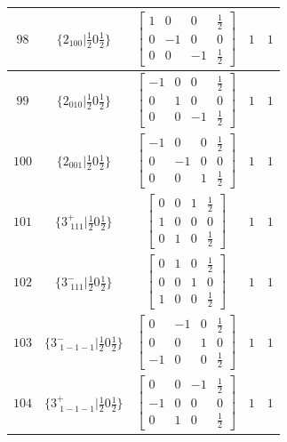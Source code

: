 \documentclass[fleqn,8pt]{jsarticle}
\begin{document}
\begin{longtable}{ccccc}
$ 98 $ & $ \{2{}_{100}|\frac{1}{2} 0 \frac{1}{2}\} $ & $ \begin{bmatrix} 1 & 0 & 0 & \frac{1}{2} \\ 0 & -1 & 0 & 0 \\ 0 & 0 & -1 & \frac{1}{2} \end{bmatrix} $ & $ 1 $ & $ 1 $ \\ \hline
$ 99 $ & $ \{2{}_{010}|\frac{1}{2} 0 \frac{1}{2}\} $ & $ \begin{bmatrix} -1 & 0 & 0 & \frac{1}{2} \\ 0 & 1 & 0 & 0 \\ 0 & 0 & -1 & \frac{1}{2} \end{bmatrix} $ & $ 1 $ & $ 1 $ \\ \hline
$ 100 $ & $ \{2{}_{001}|\frac{1}{2} 0 \frac{1}{2}\} $ & $ \begin{bmatrix} -1 & 0 & 0 & \frac{1}{2} \\ 0 & -1 & 0 & 0 \\ 0 & 0 & 1 & \frac{1}{2} \end{bmatrix} $ & $ 1 $ & $ 1 $ \\ \hline
$ 101 $ & $ \{3^{+}_{\,\,111}|\frac{1}{2} 0 \frac{1}{2}\} $ & $ \begin{bmatrix} 0 & 0 & 1 & \frac{1}{2} \\ 1 & 0 & 0 & 0 \\ 0 & 1 & 0 & \frac{1}{2} \end{bmatrix} $ & $ 1 $ & $ 1 $ \\ \hline
$ 102 $ & $ \{3^{-}_{\,\,111}|\frac{1}{2} 0 \frac{1}{2}\} $ & $ \begin{bmatrix} 0 & 1 & 0 & \frac{1}{2} \\ 0 & 0 & 1 & 0 \\ 1 & 0 & 0 & \frac{1}{2} \end{bmatrix} $ & $ 1 $ & $ 1 $ \\ \hline
$ 103 $ & $ \{3^{-}_{\,\,1-1-1}|\frac{1}{2} 0 \frac{1}{2}\} $ & $ \begin{bmatrix} 0 & -1 & 0 & \frac{1}{2} \\ 0 & 0 & 1 & 0 \\ -1 & 0 & 0 & \frac{1}{2} \end{bmatrix} $ & $ 1 $ & $ 1 $ \\ \hline
$ 104 $ & $ \{3^{+}_{\,\,1-1-1}|\frac{1}{2} 0 \frac{1}{2}\} $ & $ \begin{bmatrix} 0 & 0 & -1 & \frac{1}{2} \\ -1 & 0 & 0 & 0 \\ 0 & 1 & 0 & \frac{1}{2} \end{bmatrix} $ & $ 1 $ & $ 1 $ \\ \hline

\end{longtable}
\end{document}
